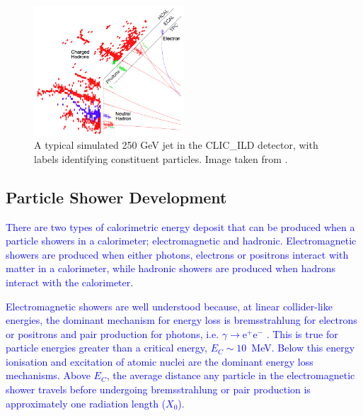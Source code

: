 \begin{figure}[h!]
\centering
\includegraphics[width=0.5\textwidth]{LCDetectorsAndPFlow/Plots/Pictures/PFlow.png}
\caption[A typical simulated 250 GeV jet in the CLIC\_ILD detector, with labels identifying constituent particles.  Image taken from  \cite{arXiv:1209.4039}.]{A typical simulated 250 GeV jet in the CLIC\_ILD detector, with labels identifying constituent particles.  Image taken from  \cite{arXiv:1209.4039}.}
\label{fig:particleflowpic}
\end{figure} 


\subsection{Particle Shower Development}
\label{sec:particleshowerdevelopment}
\textcolor{blue}{There are two types of calorimetric energy deposit that can be produced when a particle showers in a calorimeter; electromagnetic and hadronic.  Electromagnetic showers are produced when either photons, electrons or positrons interact with matter in a calorimeter, while hadronic showers are produced when hadrons interact with the calorimeter.}

\textcolor{blue}{Electromagnetic showers are well understood because, at linear collider-like energies, the dominant mechanism for energy loss is bremsstrahlung for electrons or positrons and pair production for photons, i.e. $\gamma \rightarrow \text{e}^{+}\text{e}^{-}$ \cite{Fabjan:2003aq}.  This is true for particle energies greater than a critical energy, $E_{C} \sim 10$~MeV.  Below this energy ionisation and excitation of atomic nuclei are the dominant energy loss mechanisms.  Above $E_{C}$, the average distance any particle in the electromagnetic shower travels before undergoing bremsstrahlung or pair production is approximately one radiation length ($X_{0}$).}

